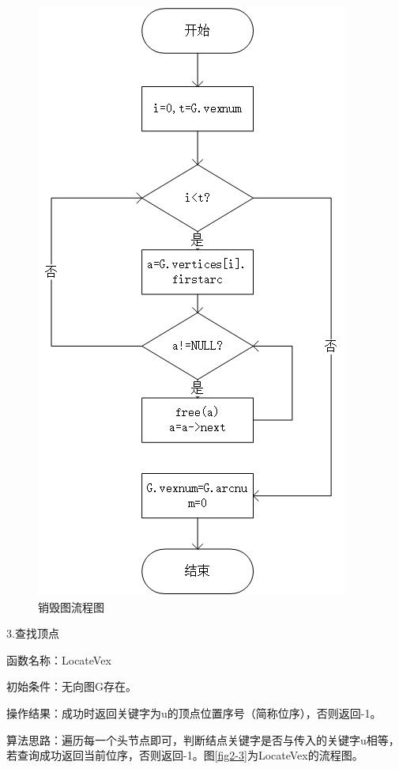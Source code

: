 \documentclass[supercite]{Experimental_Report}
\theoremstyle{definition}
\begin{document}
\begin{figure}[htb] %
	\begin{center}
		\includegraphics[scale=0.9]{./images/图/Destroy.jpg}
		\caption{销毁图流程图}
		\label{fig2-2}
	\end{center}
\end{figure}

\newpage

3.查找顶点

函数名称：LocateVex

初始条件：无向图G存在。

操作结果：成功时返回关键字为u的顶点位置序号（简称位序），否则返回-1。

算法思路：遍历每一个头节点即可，判断结点关键字是否与传入的关键字u相等，若查询成功返回当前位序，否则返回-1。图\ref{fig2-3}为LocateVex的流程图。
\end{document}
